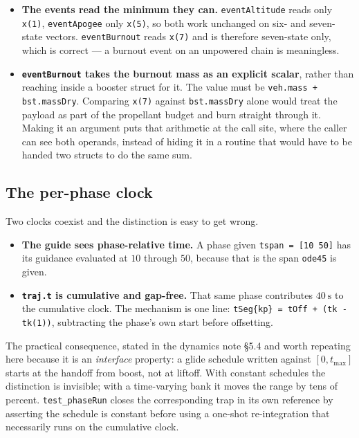 \documentclass[11pt]{article}
\newcommand{\code}[1]{\texttt{#1}}
\begin{document}
\begin{itemize}
\item \textbf{The events read the minimum they can.} \code{eventAltitude} reads
only \code{x(1)}, \code{eventApogee} only \code{x(5)}, so both work unchanged
on six- and seven-state vectors. \code{eventBurnout} reads \code{x(7)} and is
therefore seven-state only, which is correct --- a burnout event on an
unpowered chain is meaningless.

\item \textbf{\code{eventBurnout} takes the burnout mass as an explicit
scalar}, rather than reaching inside a booster struct for it. The value must be
\code{veh.mass + bst.massDry}. Comparing \code{x(7)} against
\code{bst.massDry} alone would treat the payload as part of the propellant
budget and burn straight through it. Making it an argument puts that arithmetic
at the call site, where the caller can see both operands, instead of hiding it
in a routine that would have to be handed two structs to do the same sum.
\end{itemize}

\subsection{The per-phase clock}

Two clocks coexist and the distinction is easy to get wrong.

\begin{itemize}
\item \textbf{The guide sees phase-relative time.} A phase given
\code{tspan = [10 50]} has its guidance evaluated at $10$ through $50$, because
that is the span \code{ode45} is given.
\item \textbf{\code{traj.t} is cumulative and gap-free.} That same phase
contributes $40~\mathrm{s}$ to the cumulative clock. The mechanism is one line:
\lstinline|tSeg{kp} = tOff + (tk - tk(1))|, subtracting the phase's own start
before offsetting.
\end{itemize}

The practical consequence, stated in the dynamics note \S5.4 and worth
repeating here because it is an \emph{interface} property: a glide schedule
written against $[0,t_{\max}]$ starts at the handoff from boost, not at
liftoff. With constant schedules the distinction is invisible; with a
time-varying bank it moves the range by tens of percent. \code{test\_phaseRun}
closes the corresponding trap in its own reference by asserting the schedule is
constant before using a one-shot re-integration that necessarily runs on the
cumulative clock.
\end{document}
